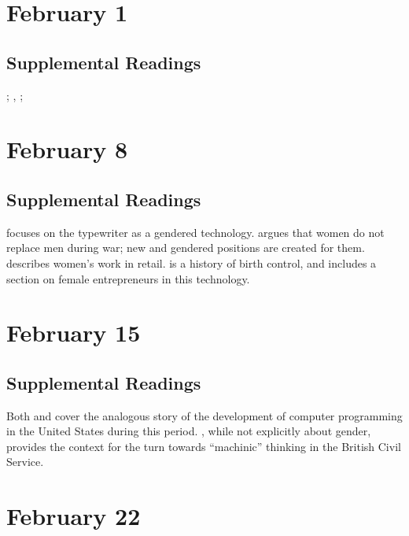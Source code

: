 \documentclass[11pt]{article}
\begin{document}
\section{February 1}

\cite{Oldenziel:1999vk}

\subsection{Supplemental Readings}
\cite{Maines:1999uw}; \cite{Rossiter:1982vn}, \cite{Tichi:1987wb}; \cite{Hacker:1989tm}

\section{February 8}

\cite{Strom:1992wx}

\subsection{Supplemental Readings}

\cite{Davies:1982vb} focuses on the typewriter as a gendered technology.  \cite{Milkman:1987tl} argues that women do not replace men during war; new and gendered positions are created for them. \cite{Benson:1987wl} describes women's work in retail. \cite{Tone:2001to} is a history of birth control, and includes a section on female entrepreneurs in this technology.

\section{February 15}

\cite{Hicks:2016uj} 

\subsection{Supplemental Readings}

Both \cite{Ensmenger:2010te} and \cite{Abbate:2012wq} cover the analogous story of the development of computer programming in the United States during this period.  \cite{Agar:2003wf}, while not explicitly about gender, provides the context for the turn towards ``machinic'' thinking in the British Civil Service.


\section{February 22}
\end{document}
